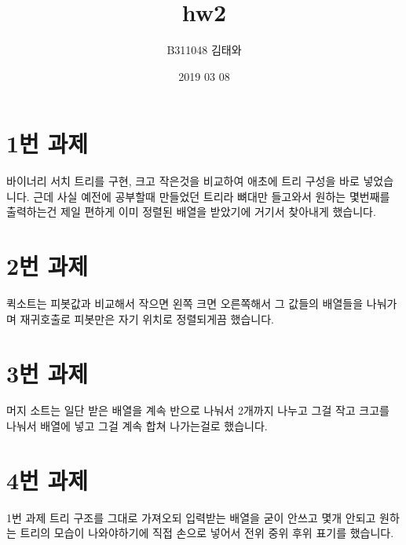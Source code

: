 \documentclass{article}
\title{hw2}
\author{B311048 김태와}
\date{2019 03 08}
\begin{document}
\maketitle

\section{1번 과제}
바이너리 서치 트리를 구현, 크고 작은것을 비교하여 애초에 트리 구성을 바로 넣었습니다.
근데 사실 예전에 공부할때 만들었던 트리라 뼈대만 들고와서 원하는 몇번째를 출력하는건 제일 편하게 이미 정렬된 배열을 받았기에 거기서 찾아내게 했습니다.

\section{2번 과제}
퀵소트는 피봇값과 비교해서 작으면 왼쪽 크면 오른쪽해서 그 값들의 배열들을 나눠가며 재귀호출로 피봇만은 자기 위치로 정렬되게끔 했습니다.

\section{3번 과제}
머지 소트는 일단 받은 배열을 계속 반으로 나눠서 2개까지 나누고 그걸 작고 크고를 나눠서 배열에 넣고 그걸 계속 합쳐 나가는걸로 했습니다.

\section{4번 과제}
1번 과제 트리 구조를 그대로 가져오되 입력받는 배열을 굳이 안쓰고 몇개 안되고 원하는 트리의 모습이 나와야하기에 직접 손으로 넣어서 전위 중위 후위 표기를 했습니다.
\end{document}
